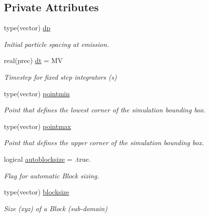 \subsection*{Private Attributes}
\begin{DoxyCompactItemize}
\item 
type(vector) \mbox{\hyperlink{structsimulationglobals__mod_1_1simdefs__t_af09254532178c7d37b6502af7ead113c}{dp}}
\begin{DoxyCompactList}\small\item\em Initial particle spacing at emission. \end{DoxyCompactList}\item 
real(prec) \mbox{\hyperlink{structsimulationglobals__mod_1_1simdefs__t_a3893522d33efbdcb47d81ed1963a228c}{dt}} = MV
\begin{DoxyCompactList}\small\item\em Timestep for fixed step integrators (s) \end{DoxyCompactList}\item 
type(vector) \mbox{\hyperlink{structsimulationglobals__mod_1_1simdefs__t_ac4fc53f104e7620ef7f0384382dcc1a2}{pointmin}}
\begin{DoxyCompactList}\small\item\em Point that defines the lowest corner of the simulation bounding box. \end{DoxyCompactList}\item 
type(vector) \mbox{\hyperlink{structsimulationglobals__mod_1_1simdefs__t_ac6f91911424ae7c225e583c546283d2d}{pointmax}}
\begin{DoxyCompactList}\small\item\em Point that defines the upper corner of the simulation bounding box. \end{DoxyCompactList}\item 
logical \mbox{\hyperlink{structsimulationglobals__mod_1_1simdefs__t_afe52beb1868355418e312ffb9ef8f0ad}{autoblocksize}} = .true.
\begin{DoxyCompactList}\small\item\em Flag for automatic Block sizing. \end{DoxyCompactList}\item 
type(vector) \mbox{\hyperlink{structsimulationglobals__mod_1_1simdefs__t_a163dc34a434aec7372dcad90b48ab0ed}{blocksize}}
\begin{DoxyCompactList}\small\item\em Size (xyz) of a Block (sub-\/domain) \end{DoxyCompactList}\item 

\end{DoxyCompactItemize}
